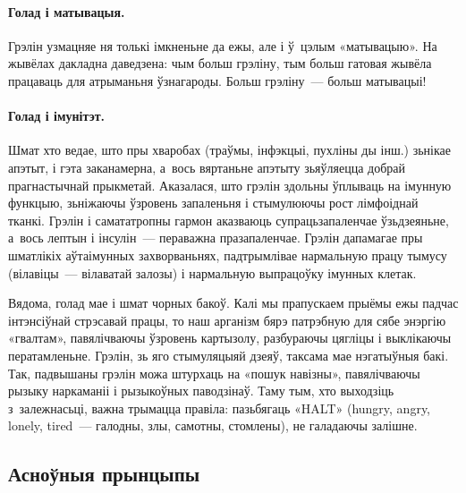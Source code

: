 \paragraph{Голад і матывацыя.}
Грэлін узмацняе ня толькі імкненьне да ежы, але і ў~цэлым «матывацыю». На жывёлах дакладна даведзена: чым больш грэліну, тым больш гатовая жывёла працаваць для атрыманьня ўзнагароды. Больш грэліну~--- больш матывацыі!


\paragraph{Голад і імунітэт.}
Шмат хто ведае, што пры хваробах (траўмы, інфэкцыі, пухліны ды інш.) зьнікае апэтыт, і гэта заканамерна, а~вось вяртаньне апэтыту зьяўляецца добрай прагнастычнай прыкметай. Аказалася, што грэлін здольны ўплываць на імунную функцыю, зьніжаючы ўзровень запаленьня і стымулюючы рост лімфоіднай тканкі. Грэлін і самататропны гармон аказваюць супрацьзапаленчае ўзьдзеяньне, а~вось лептын і інсулін~--- пераважна празапаленчае. Грэлін дапамагае пры шматлікіх аўтаімунных захворваньнях, падтрымлівае нармальную працу тымусу (вілавіцы~--- вілаватай залозы) і нармальную выпрацоўку імунных клетак.

Вядома, голад мае і шмат чорных бакоў. Калі мы прапускаем прыёмы ежы падчас інтэнсіўнай стрэсавай працы, то наш арганізм бярэ патрэбную для сябе энэргію «гвалтам», павялічваючы ўзровень картызолу, разбураючы цягліцы і выклікаючы ператамленьне. Грэлін, зь яго стымуляцыяй дзеяў, таксама мае нэгатыўныя бакі. Так, падвышаны грэлін можа штурхаць на «пошук навізны», павялічваючы рызыку наркаманіі і рызыкоўных паводзінаў. Таму тым, хто выходзіць з~залежнасьці, важна трымацца правіла: пазьбягаць «HALT» (hungry, angry, lonely, tired~--- галодны, злы, самотны, стомлены), не галадаючы залішне.

\subsection{Асноўныя прынцыпы}

